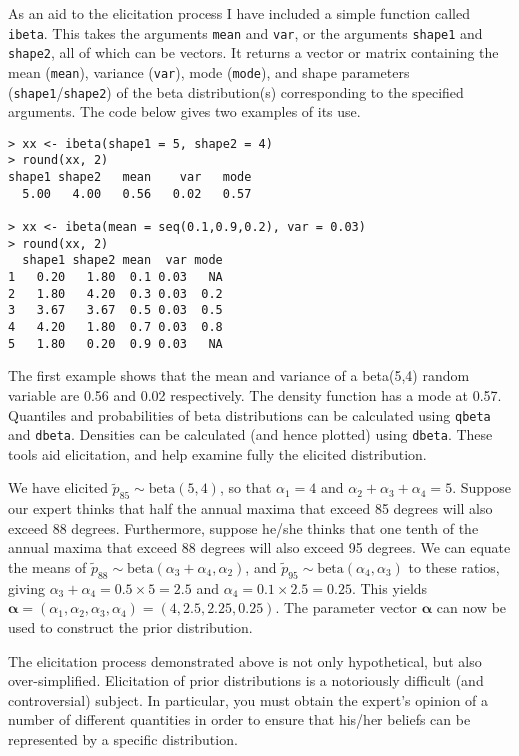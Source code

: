 \documentclass[11pt,a4paper]{article}
\newcommand{\bs}{\boldsymbol}
\begin{document}
As an aid to the elicitation process I have included a simple function
called \verb+ibeta+.  This takes the arguments \verb+mean+ and
\verb+var+, or the arguments \verb+shape1+ and \verb+shape2+, all of
which can be vectors.  It returns a vector or matrix containing the
mean (\verb+mean+), variance (\verb+var+), mode (\verb+mode+), and
shape parameters (\verb+shape1+/\verb+shape2+) of the beta
distribution(s) corresponding to the specified arguments.  The code
below gives two examples of its use.

\begin{verbatim}
> xx <- ibeta(shape1 = 5, shape2 = 4)
> round(xx, 2)
shape1 shape2   mean    var   mode 
  5.00   4.00   0.56   0.02   0.57 

> xx <- ibeta(mean = seq(0.1,0.9,0.2), var = 0.03)
> round(xx, 2)
  shape1 shape2 mean  var mode
1   0.20   1.80  0.1 0.03   NA
2   1.80   4.20  0.3 0.03  0.2
3   3.67   3.67  0.5 0.03  0.5
4   4.20   1.80  0.7 0.03  0.8
5   1.80   0.20  0.9 0.03   NA
\end{verbatim}

The first example shows that the mean and variance of a beta(5,4)
random variable are 0.56 and 0.02 respectively.  The density function
has a mode at 0.57.  Quantiles and probabilities of beta distributions
can be calculated using \verb+qbeta+ and \verb+dbeta+.  Densities can
be calculated (and hence plotted) using \verb+dbeta+.  These tools aid
elicitation, and help examine fully the elicited distribution.

We have elicited $\tilde{p}_{85} \sim \text{beta}(5,4)$, so that
$\alpha_1 = 4$ and $\alpha_2+\alpha_3+\alpha_4 = 5$.  Suppose our
expert thinks that half the annual maxima that exceed 85 degrees will
also exceed 88 degrees.  Furthermore, suppose he/she thinks that one
tenth of the annual maxima that exceed 88 degrees will also exceed 95
degrees.  We can equate the means of $\tilde{p}_{88} \sim
\text{beta}(\alpha_3 + \alpha_4,\alpha_2)$, and $\tilde{p}_{95} \sim
\text{beta}(\alpha_4,\alpha_3)$ to these ratios, giving
$\alpha_3+\alpha_4 = 0.5\times5 = 2.5$ and $\alpha_4 = 0.1\times2.5 =
0.25$.  This yields $\bs{\alpha} =
(\alpha_1,\alpha_2,\alpha_3,\alpha_4) = (4,2.5,2.25,0.25)$.  The
parameter vector $\bs{\alpha}$ can now be used to construct the prior
distribution.

The elicitation process demonstrated above is not only hypothetical,
but also over-simplified.  Elicitation of prior distributions is a
notoriously difficult (and controversial) subject.  In particular, you
must obtain the expert's opinion of a number of different quantities
in order to ensure that his/her beliefs can be represented by a
specific distribution.
\end{document}
